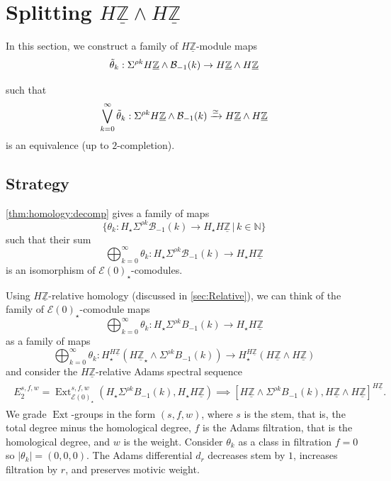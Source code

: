 \documentclass{amsart}
\theoremstyle{plain}
\numberwithin{equation}{section}
\numberwithin{figure}{section}
\DeclareMathOperator{\Ext}{Ext}
\newcommand{\mN}{{\mathbb N}}
\newcommand{\mZ}{{\mathbb Z}}
\newcommand{\cB}{{\mathcal B}}
\newcommand{\cE}{{\mathcal E}}
\newcommand{\umZ}{\underline{\mZ}}
\newcommand{\0}{\langle 0 \rangle }
\begin{document}
\section{Splitting {$H \umZ \wedge H \umZ$}}\label{sec: height zero}

In this section, we construct a family of $H \umZ$-module maps
\[ \Tilde{\theta}_k: \Sigma^{\rho k} H \umZ \wedge \cB_{-1}(k) \rightarrow H \umZ \wedge H\umZ \] 

such that
    \[ \bigvee\limits_{k=0}^{\infty}\Tilde{\theta}_k: \Sigma^{\rho k} H \umZ \wedge \cB_{-1}(k) \xrightarrow{\simeq} H \umZ \wedge H \umZ \]
is an equivalence (up to $2$-completion). 


\subsection{Strategy} \label{sec:heightzerostrategy} \cref{thm:homology:decomp} gives a family of maps
$$\{\theta_k: H_\star \Sigma^{\rho k} \cB_{ - 1} (k) \to H_\star H \umZ \, | \, k \in \mN \} $$
such that their sum
$$ \bigoplus_{k = 0}^\infty \theta_k : H_\star \Sigma^{\rho k} \cB_{ - 1} (k) \to H_\star H \umZ $$
is an isomorphism of $\mathcal{E}(0)_\star$-comodules. 

Using $H \umZ$-relative homology (discussed in \cref{sec:Relative}), we can think of the family of $\mathcal{E}(0)_{\star}$-comodule maps
$$ \bigoplus_{k = 0}^\infty \theta_k : H_{\star} \Sigma^{\rho k} B_{-1} (k) \to H_{\star} H \umZ $$
as a family of maps
$$ \bigoplus_{k = 0}^\infty \theta_k : H_{\star}^{H\umZ} (H \umZ_{\star} \wedge \Sigma^{\rho k}  B_{-1} (k)) \to H_{\star}^{H \umZ} (H \umZ \wedge H \umZ)$$
and consider the $H\umZ$-relative Adams spectral sequence 
\begin{align} \label{eq:heightZeroAss}
\begin{split}
E_2^{s,f,w}  = \Ext_{\cE(0)_{\star}}^{s,f,w} (H_{\star} \Sigma^{\rho k} B_{-1}(k), H_{\star} H \umZ ) 
\implies [H \umZ \wedge \Sigma^{\rho k}B_{-1} (k), H\umZ \wedge H \umZ]^{H \umZ}. 
\end{split}
\end{align}
We grade $\Ext$-groups in the form $(s,f,w)$, where $s$ is the stem, that is, the total degree minus the homological degree, $f$ is the Adams filtration, that is the homological degree, and $w$ is the weight. Consider $\theta_k$ as a class in filtration $f = 0$ so $|\theta_k| = (0,0,0)$. The Adams differential $d_{r}$ decreases stem by $1$, increases filtration by $r$, and preserves motivic weight.
\end{document}
